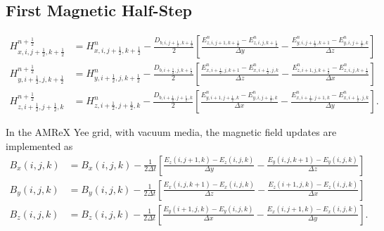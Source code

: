 \documentclass{article}
\numberwithin{equation}{section}
\numberwithin{figure}{section}
\begin{document}
\subsection{First Magnetic Half-Step}
\begin{subequations}\label{eq:fdtd-first-h-half}
    \begin{align}
        H_{x,i,j+\frac{1}{2},k+\frac{1}{2}}^{n+\frac{1}{2}} & = H_{x,i,j+\frac{1}{2},k+\frac{1}{2}}^n - \frac{D_{b,i,j+\frac{1}{2},k+\frac{1}{2}}}{2} \left[\frac{E_{z,i,j+1,k+\frac{1}{2}}^n-E_{z,i,j,k+\frac{1}{2}}^n}{\Delta y} - \frac{E_{y,i,j+\frac{1}{2},k+1}^n-E_{y,i,j+\frac{1}{2},k}^n}{\Delta z}\right]
        \label{eq:fdtd-first-hx}                                                                                                                                                                                                                                                                                    \\
        H_{y,i+\frac{1}{2},j,k+\frac{1}{2}}^{n+\frac{1}{2}} & = H_{y,i+\frac{1}{2},j,k+\frac{1}{2}}^n - \frac{D_{b,i+\frac{1}{2},j,k+\frac{1}{2}}}{2} \left[\frac{E_{x,i+\frac{1}{2},j,k+1}^n-E_{x,i+\frac{1}{2},j,k}^n}{\Delta z} - \frac{E_{z,i+1,j,k+\frac{1}{2}}^n-E_{z,i,j,k+\frac{1}{2}}^n}{\Delta x}\right]
        \label{eq:fdtd-first-hy}                                                                                                                                                                                                                                                                                    \\
        H_{z,i+\frac{1}{2},j+\frac{1}{2},k}^{n+\frac{1}{2}} & = H_{z,i+\frac{1}{2},j+\frac{1}{2},k}^n - \frac{D_{b,i+\frac{1}{2},j+\frac{1}{2},k}}{2} \left[\frac{E_{y,i+1,j+\frac{1}{2},k}^n-E_{y,i,j+\frac{1}{2},k}^n}{\Delta x} - \frac{E_{x,i+\frac{1}{2},j+1,k}^n-E_{x,i+\frac{1}{2},j,k}^n}{\Delta y}\right].
        \label{eq:fdtd-first-hz}
    \end{align}
\end{subequations}

In the AMReX Yee grid, with vacuum media, the magnetic field updates are implemented as
\begin{subequations}\label{eq:fdtd-first-h-half-amrex}
    \begin{align}
        B_x(i, j, k) & = B_x(i, j, k) - \frac{1}{2\Delta t} \left[\frac{E_z(i, j + 1, k) - E_z(i, j, k)}{\Delta y} - \frac{E_y(i, j, k + 1) - E_y(i, j, k)}{\Delta z}\right]  \\
        B_y(i, j, k) & = B_y(i, j, k) - \frac{1}{2\Delta t} \left[\frac{E_x(i, j, k + 1) - E_x(i, j, k)}{\Delta z} - \frac{E_z(i + 1, j, k) - E_z(i, j, k)}{\Delta x}\right]  \\
        B_z(i, j, k) & = B_z(i, j, k) - \frac{1}{2\Delta t} \left[\frac{E_y(i + 1, j, k) - E_y(i, j, k)}{\Delta x} - \frac{E_x(i, j + 1, k) - E_x(i, j, k)}{\Delta y}\right].
    \end{align}
\end{subequations}
\end{document}
